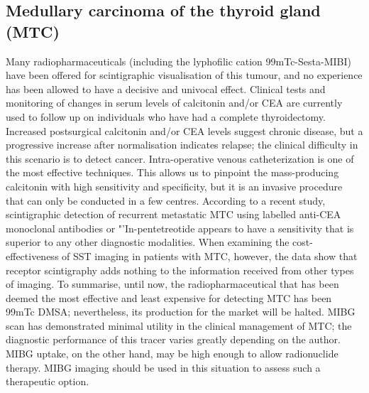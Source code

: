 \documentclass{article}
\begin{document}
\begin{multicols}{2}
\subsection{Medullary carcinoma of the thyroid gland (MTC)}

Many radiopharmaceuticals (including the lyphofilic cation 99mTc-Sesta-MIBI) have been offered for scintigraphic visualisation of this tumour, and no experience has been allowed to have a decisive and univocal effect. Clinical tests and monitoring of changes in serum levels of calcitonin and/or CEA are currently used to follow up on individuals who have had a complete thyroidectomy. Increased postsurgical calcitonin and/or CEA levels suggest chronic disease, but a progressive increase after normalisation indicates relapse; the clinical difficulty in this scenario is to detect cancer. Intra-operative venous catheterization is one of the most effective techniques. This allows us to pinpoint the mass-producing calcitonin with high sensitivity and specificity, but it is an invasive procedure that can only be conducted in a few centres. According to a recent study, scintigraphic detection of recurrent metastatic MTC using labelled anti-CEA monoclonal antibodies or "'In-pentetreotide appears to have a sensitivity that is superior to any other diagnostic modalities. When examining the cost-effectiveness of SST imaging in patients with MTC, however, the data show that receptor scintigraphy adds nothing to the information received from other types of imaging. To summarise, until now, the radiopharmaceutical that has been deemed the most effective and least expensive for detecting MTC has been 99mTc DMSA; nevertheless, its production for the market will be halted. MIBG scan has demonstrated minimal utility in the clinical management of MTC; the diagnostic performance of this tracer varies greatly depending on the author. MIBG uptake, on the other hand, may be high enough to allow radionuclide therapy. MIBG imaging should be used in this situation to assess such a therapeutic option\cite{kurtaran1999receptor}. 


\end{multicols}
\end{document}
